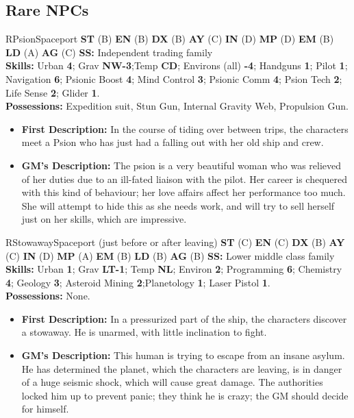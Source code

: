 \hrulefill

\subsection{Rare NPCs}
\label{sec:rare-npcs}

\setcounter{npc}{0}
\begin{npc}{R}{Psion}{Spaceport}
\textbf{ST} (B) \textbf{EN} (B) \textbf{DX} (B) \textbf{AY} (C) \textbf{IN} (D) \textbf{MP} (D) \textbf{EM} (B) \textbf{LD} (A) \textbf{AG} (C) \textbf{SS:} Independent trading family \\
\textbf{Skills:} Urban \textbf{4}; Grav \textbf{NW-3};Temp \textbf{CD}; Environs (all) \textbf{-4}; Handguns \textbf{1}; Pilot \textbf{1}; Navigation \textbf{6}; Psionic Boost \textbf{4}; Mind Control \textbf{3}; 
Psionic Comm \textbf{4}; Psion Tech \textbf{2}; Life Sense \textbf{2}; Glider \textbf{1}. \\
\textbf{Possessions:} Expedition suit, Stun Gun, Internal Gravity Web, Propulsion Gun. 
\begin{itemize}
\item \textbf{First Description:} In the course of tiding over between trips, the characters meet a Psion who has just had a falling out with her old 
ship and crew. 
\item \textbf{GM's Description:} The psion is a very beautiful woman who was relieved of her duties due to an ill-fated liaison with the pilot. Her 
career is chequered with this kind of behaviour; her love affairs affect her performance too much. She will attempt to hide this as she 
needs work, and will try to sell herself just on her skills, which are impressive. 
\end{itemize}
\end{npc}

\hrulefill

\begin{npc}{R}{Stowaway}{Spaceport (just before or after leaving)} 
\textbf{ST} (C) \textbf{EN} (C) \textbf{DX} (B) \textbf{AY} (C) \textbf{IN} (D) \textbf{MP} (A) \textbf{EM} (B) \textbf{LD} (B) \textbf{AG} (B) \textbf{SS:} Lower middle class family \\
\textbf{Skills:} Urban \textbf{1}; Grav \textbf{LT-1}; Temp \textbf{NL}; Environ \textbf{2}; Programming \textbf{6}; Chemistry \textbf{4}; Geology \textbf{3}; Asteroid Mining \textbf{2};Planetology \textbf{1}; Laser 
Pistol \textbf{1}. \\
\textbf{Possessions:} None. 
\begin{itemize}
\item \textbf{First Description:} In a pressurized part of the ship, the characters discover a stowaway. He is unarmed, with little inclination to fight. 
\item \textbf{GM's Description:} This human is trying to escape from an insane asylum. He has determined the planet, which the characters are 
leaving, is in danger of a huge seismic shock, which will cause great damage. The authorities locked him up to prevent panic; they 
think he is crazy; the GM should decide for himself. 
\end{itemize}
\end{npc}

